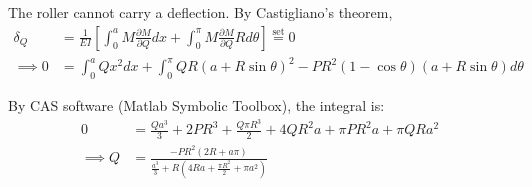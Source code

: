 The roller cannot carry a deflection. By Castigliano's theorem, 
\begin{align*}
    \delta_Q &= \frac{1}{EI} \left[\int_{0}^{a} M \frac{\partial M}{\partial Q} dx + 
    \int_{0}^{\pi} M \frac{\partial M}{\partial Q} R d\theta \right] \overset{\text{set}}{=} 0 \\
    \implies 0 &= \int_{0}^{a} Qx^2 dx + \int_{0}^{\pi} QR(a+R\sin\theta)^2 - PR^2(1-\cos\theta)(a+R\sin\theta) d\theta 
\end{align*}

By CAS software (Matlab Symbolic Toolbox), the integral is:
\begin{align*}
    0 &= \frac{Qa^3}{3} + 2P R^3 + \frac{Q\pi R^3}{2} + 4QR^2a + \pi PR^2a + \pi QRa^2 \\
    \implies Q &= \boxed{\frac{-PR^2(2R + a \pi)}{\frac{a^3}{3} + R(4Ra + \frac{\pi R^2}{2} + \pi a^2)}}
\end{align*}